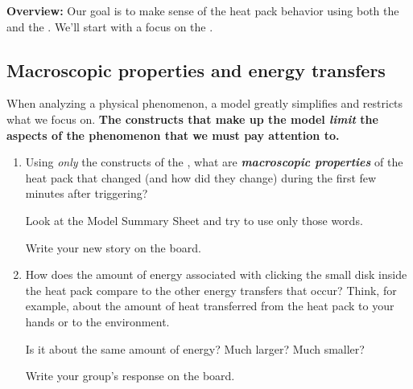 \begin{overview}
	\noindent
	{\bfseries Overview:} Our goal is to make sense of the heat pack behavior using both the \ThreePhaseModel{} and the \EnergyInteractionModel{}. We'll start with a focus on the \ThreePhaseModel{}.

\end{overview}

\subsection{Macroscopic properties and energy transfers}
\label{A1}

When analyzing a physical phenomenon, a model greatly simplifies and restricts what we focus on. \textbf{The constructs that make up the model {\em limit} the aspects of the phenomenon that we must pay attention to.}

\begin{enumerate}
	\item Using {\em only} the constructs of the {\bfseries \ThreePhaseModel{}}, what are \textbf{\em macroscopic properties} of the heat pack that changed (and how did they change) during the first few minutes after triggering?
	
		Look at the Model Summary Sheet and try to use only those words.
		
		Write your new story on the board.
		

	
	\item How does the amount of energy associated with clicking the small disk inside the heat pack compare to the other energy transfers that occur? Think, for example, about the amount of heat transferred from the heat pack to your hands or to the environment.
	 
	 	Is it about the same amount of energy? Much larger? Much smaller?
	 	
	 	Write your group's response on the board.
	

\WCD

\end{enumerate}

